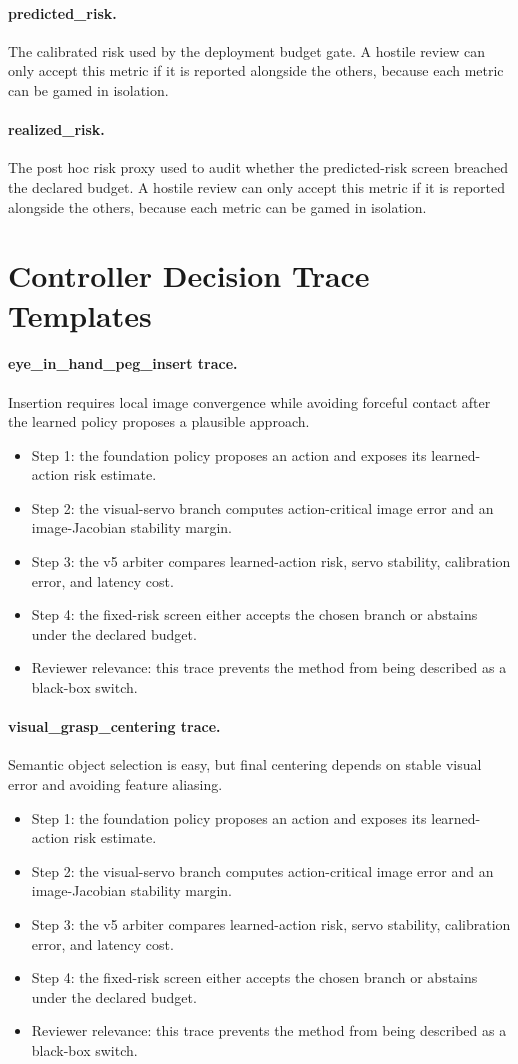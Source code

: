 \documentclass{article}
\begin{document}
\paragraph{predicted\_risk.} The calibrated risk used by the deployment budget gate. A hostile review can only accept this metric if it is reported alongside the others, because each metric can be gamed in isolation.
\paragraph{realized\_risk.} The post hoc risk proxy used to audit whether the predicted-risk screen breached the declared budget. A hostile review can only accept this metric if it is reported alongside the others, because each metric can be gamed in isolation.
\clearpage
\section{Controller Decision Trace Templates}
\paragraph{eye\_in\_hand\_peg\_insert trace.} Insertion requires local image convergence while avoiding forceful contact after the learned policy proposes a plausible approach.
\begin{itemize}
\item Step 1: the foundation policy proposes an action and exposes its learned-action risk estimate.
\item Step 2: the visual-servo branch computes action-critical image error and an image-Jacobian stability margin.
\item Step 3: the v5 arbiter compares learned-action risk, servo stability, calibration error, and latency cost.
\item Step 4: the fixed-risk screen either accepts the chosen branch or abstains under the declared budget.
\item Reviewer relevance: this trace prevents the method from being described as a black-box switch.
\end{itemize}
\paragraph{visual\_grasp\_centering trace.} Semantic object selection is easy, but final centering depends on stable visual error and avoiding feature aliasing.
\begin{itemize}
\item Step 1: the foundation policy proposes an action and exposes its learned-action risk estimate.
\item Step 2: the visual-servo branch computes action-critical image error and an image-Jacobian stability margin.
\item Step 3: the v5 arbiter compares learned-action risk, servo stability, calibration error, and latency cost.
\item Step 4: the fixed-risk screen either accepts the chosen branch or abstains under the declared budget.
\item Reviewer relevance: this trace prevents the method from being described as a black-box switch.
\end{itemize}
\end{document}
